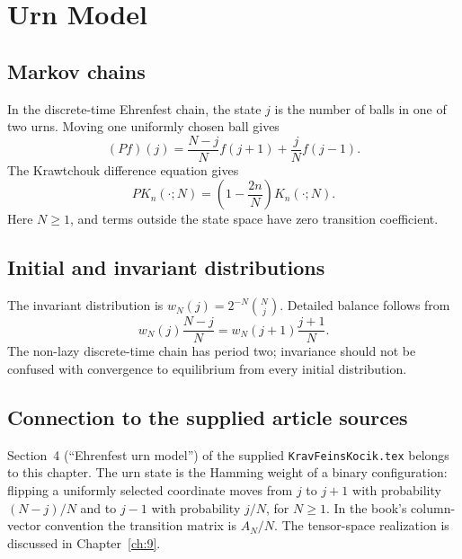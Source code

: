 \chapter{Urn Model}
\label{ch:3}
\section{Markov chains}
\label{sec:3-1}
In the discrete-time Ehrenfest chain, the state $j$ is the number of balls in one of two urns. Moving one uniformly chosen ball gives
\[
(Pf)(j)=\frac{N-j}{N}f(j+1)+\frac jN f(j-1).
\]
The Krawtchouk difference equation gives
\[
P K_n(\cdot;N)=\left(1-\frac{2n}{N}\right)K_n(\cdot;N).
\]
Here $N\geq1$, and terms outside the state space have zero transition coefficient.

\section{Initial and invariant distributions}
\label{sec:3-2}
The invariant distribution is $w_N(j)=2^{-N}\binom Nj$. Detailed balance follows from
\[
w_N(j)\frac{N-j}{N}=w_N(j+1)\frac{j+1}{N}.
\]
The non-lazy discrete-time chain has period two; invariance should not be confused with convergence to equilibrium from every initial distribution.


\section*{Connection to the supplied article sources}
Section~4 (``Ehrenfest urn model'') of the supplied
\texttt{KravFeinsKocik.tex} belongs to this chapter.
The urn state is the Hamming weight of a binary configuration: flipping
a uniformly selected coordinate moves from $j$ to $j+1$ with probability
$(N-j)/N$ and to $j-1$ with probability $j/N$, for $N\geq1$.
In the book's column-vector convention the transition matrix is
$A_N/N$. The tensor-space realization is discussed in Chapter~\ref{ch:9}.
